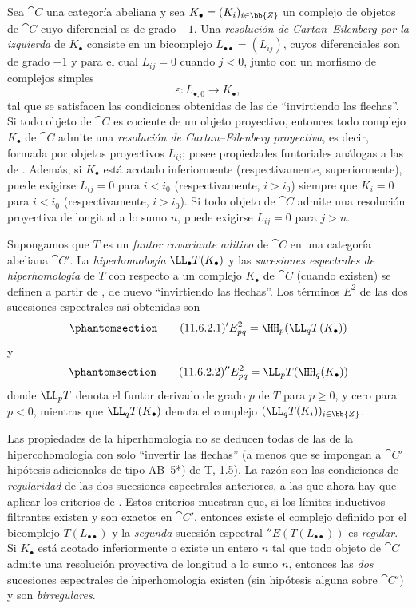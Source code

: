 \documentclass[oneside]{amsart}
\renewcommand{\geq}{\geqslant}
\newcommand{\oldpage}[2][]{{\marginnote{\normalfont\textbf{#1}~|~#2}}\ignorespaces}
\let\EGAOriginalLabel\label
\renewcommand{\label}[1]{\phantomsection\EGAOriginalLabel{#1}}
\begin{document}
\begin{env}[11.6.1]
\label{0.11.6.1}
Sea $\cat{C}$ una categoría abeliana y sea $K_\bullet=(K_i)_{i\in\bb{Z}}$ un complejo de objetos de $\cat{C}$ cuyo diferencial es de grado $-1$.
Una \emph{resolución de Cartan--Eilenberg por la izquierda} de $K_\bullet$ consiste en un bicomplejo $L_{\bullet\bullet}=(L_{ij})$, cuyos diferenciales son de grado $-1$ y para el cual $L_{ij}=0$ cuando $j<0$, junto con un morfismo de complejos simples
\[
  \varepsilon:L_{\bullet,0}\longrightarrow K_\bullet,
\]
tal que se satisfacen las condiciones obtenidas de las de  ``invirtiendo las flechas''.
Si todo objeto de $\cat{C}$ es cociente de un objeto proyectivo, entonces todo complejo $K_\bullet$ de $\cat{C}$ admite una \emph{resolución de Cartan--Eilenberg proyectiva}, es decir, formada por objetos proyectivos $L_{ij}$; posee propiedades funtoriales análogas a las de .
Además, si $K_\bullet$ está acotado inferiormente (respectivamente, superiormente), puede exigirse $L_{ij}=0$ para $i<i_0$ (respectivamente, $i>i_0$) siempre que $K_i=0$ para $i<i_0$ (respectivamente, $i>i_0$).
Si todo objeto de $\cat{C}$ admite una resolución proyectiva de longitud a lo sumo $n$, puede exigirse $L_{ij}=0$ para $j>n$.
\end{env}

\begin{env}[11.6.2]
\label{0.11.6.2}
\oldpage[0\textsubscript{III}]{40}
Supongamos que $T$ es un \emph{funtor covariante aditivo} de $\cat{C}$ en una categoría abeliana $\cat{C}'$.
La \emph{hiperhomología} $\LL_\bullet T(K_\bullet)$ y las \emph{sucesiones espectrales de hiperhomología} de $T$ con respecto a un complejo $K_\bullet$ de $\cat{C}$ (cuando existen) se definen a partir de , de nuevo ``invirtiendo las flechas''.
Los términos $E^2$ de las dos sucesiones espectrales así obtenidas son
\[
\label{0.11.6.2.1}
\tag{11.6.2.1}
  {}'E^2_{pq}
  =\HH_p(\LL_qT(K_\bullet))
\]
y
\[
\label{0.11.6.2.2}
\tag{11.6.2.2}
  {}''E^2_{pq}
  =\LL_pT(\HH_q(K_\bullet))
\]
donde $\LL_pT$ denota el funtor derivado de grado $p$ de $T$ para $p\geq0$, y cero para $p<0$, mientras que $\LL_qT(K_\bullet)$ denota el complejo $(\LL_qT(K_i))_{i\in\bb{Z}}$.

Las propiedades de la hiperhomología no se deducen todas de las de la hipercohomología con solo ``invertir las flechas'' (a menos que se impongan a $\cat{C}'$ hipótesis adicionales de tipo AB~5*) de T, 1.5).
La razón son las condiciones de \emph{regularidad} de las dos sucesiones espectrales anteriores, a las que ahora hay que aplicar los criterios de .
Estos criterios muestran que, si los límites inductivos filtrantes existen y son exactos en $\cat{C}'$, entonces existe el complejo definido por el bicomplejo $T(L_{\bullet\bullet})$ y la \emph{segunda} sucesión espectral ${}''E(T(L_{\bullet\bullet}))$ es \emph{regular}.
Si $K_\bullet$ está acotado inferiormente o existe un entero $n$ tal que todo objeto de $\cat{C}$ admite una resolución proyectiva de longitud a lo sumo $n$, entonces las \emph{dos} sucesiones espectrales de hiperhomología existen (sin hipótesis alguna sobre $\cat{C}'$) y son \emph{birregulares}.
\end{env}
\end{document}
